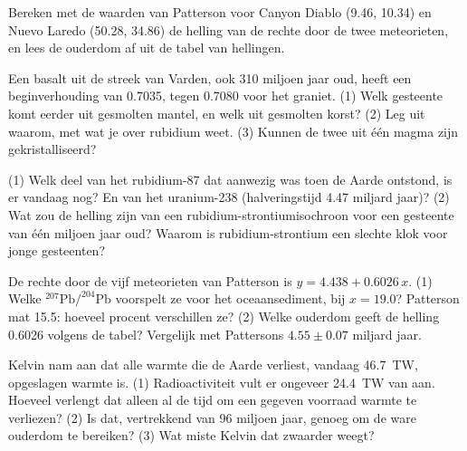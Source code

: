 \begin{exercise}[$\star\star$]\label{exo:g12:age-of-the-earth:11}
Bereken met de waarden van Patterson voor Canyon Diablo (9.46, 10.34) en Nuevo Laredo
(50.28, 34.86) de helling van de rechte door de twee meteorieten,
en lees de ouderdom af uit de tabel van hellingen.
\end{exercise}

\begin{exercise}[$\star\star\star$]\label{exo:g12:age-of-the-earth:12}
Een basalt uit de streek van Varden, ook 310 miljoen jaar oud, heeft een
beginverhouding van 0.7035, tegen 0.7080 voor het graniet. (1) Welk gesteente komt eerder
uit gesmolten mantel, en welk uit gesmolten korst? (2) Leg uit
waarom, met wat je over rubidium weet. (3) Kunnen de twee uit
één magma zijn gekristalliseerd?
\end{exercise}

\begin{exercise}[$\star\star\star$]\label{exo:g12:age-of-the-earth:13}
(1) Welk deel van het rubidium-87 dat aanwezig was toen de Aarde ontstond, is er
vandaag nog? En van het uranium-238 (halveringstijd 4.47 miljard jaar)? (2) Wat zou
de helling zijn van een rubidium-strontiumisochroon voor een gesteente van één miljoen jaar
oud? Waarom is rubidium-strontium een slechte klok voor jonge gesteenten?
\end{exercise}

\begin{exercise}[$\star\star\star$]\label{exo:g12:age-of-the-earth:14}
De rechte door de vijf meteorieten van Patterson is $y = 4.438 + 0.6026\,x$.
(1) Welke $^{207}\mathrm{Pb}/^{204}\mathrm{Pb}$ voorspelt ze voor het
oceaansediment, bij $x = 19.0$? Patterson mat 15.5: hoeveel procent verschillen ze?
(2) Welke ouderdom geeft de helling 0.6026 volgens de tabel? Vergelijk met
Pattersons $4.55 \pm 0.07$ miljard jaar.
\end{exercise}

\begin{exercise}[$\star\star\star$]\label{exo:g12:age-of-the-earth:15}
Kelvin nam aan dat alle warmte die de Aarde verliest, vandaag \qty{46.7}{TW}, opgeslagen
warmte is. (1) Radioactiviteit vult er ongeveer \qty{24.4}{TW} van aan. Hoeveel
verlengt dat alleen al de tijd om een gegeven voorraad warmte te verliezen?
(2) Is dat, vertrekkend van 96 miljoen jaar, genoeg om de ware ouderdom te bereiken?
(3) Wat miste Kelvin dat zwaarder weegt?
\end{exercise}


